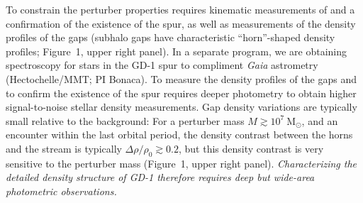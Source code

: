 \documentclass[11pt]{article}
\newcommand{\msun}{\textrm{M}_\odot}
\begin{document}
To constrain the perturber properties requires kinematic measurements of and a confirmation of the existence of the spur, as well as measurements of the density profiles of the gaps (subhalo gaps have characteristic ``horn''-shaped density profiles; Figure~1, upper right panel).
In a separate program, we are obtaining spectroscopy for stars in the GD-1 spur to compliment \textit{Gaia} astrometry (Hectochelle/MMT; PI Bonaca).
To measure the density profiles of the gaps and to confirm the existence of the spur requires deeper photometry to obtain higher signal-to-noise stellar density measurements.
Gap density variations are typically small relative to the background: For a perturber mass $M \gtrsim 10^7~\msun$, and an encounter within the last orbital period, the density contrast between the horns and the stream is typically $\Delta\rho/\rho_0 \gtrsim 0.2$, but this density contrast is very sensitive to the perturber mass (Figure~1, upper right panel).
\emph{Characterizing the detailed density structure of GD-1 therefore requires deep but wide-area photometric observations.}
\end{document}
